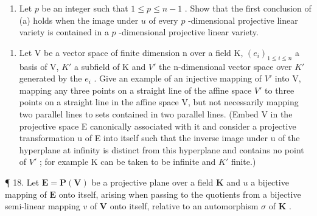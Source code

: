 \begin{enumerate}
\def\labelenumi{(\alph{enumi})}
\setcounter{enumi}{1}
\tightlist
\item
  Let \(p\) be an integer such that \(1 \leqslant p \leqslant n - 1\) . Show that the first conclusion of (a) holds when the image under \(u\) of every \(p\) -dimensional projective linear variety is contained in a \(p\) -dimensional projective linear variety.
\end{enumerate}

\begin{enumerate}
\def\labelenumi{\arabic{enumi}.}
\setcounter{enumi}{16}
\tightlist
\item
  Let V be a vector space of finite dimension n over a field K, \((e_{i})_{1\leq i\leq n}\) a basis of V, \(K'\) a subfield of K and \(V'\) the n-dimensional vector space over \(K'\) generated by the \(e_{i}\) . Give an example of an injective mapping of \(V'\) into V, mapping any three points on a straight line of the affine space \(V'\) to three points on a straight line in the affine space V, but not necessarily mapping two parallel lines to sets contained in two parallel lines. (Embed V in the projective space E canonically associated with it and consider a projective transformation u of E into itself such that the inverse image under u of the hyperplane at infinity is distinct from this hyperplane and contains no point of \(V'\) ; for example K can be taken to be infinite and \(K'\) finite.)
\end{enumerate}

¶ 18. Let \(\mathbf{E} = \mathbf{P}(\mathbf{V})\) be a projective plane over a field \(\mathbf{K}\) and \(u\) a bijective mapping of \(\mathbf{E}\) onto itself, arising when passing to the quotients from a bijective semi-linear mapping \(v\) of \(\mathbf{V}\) onto itself, relative to an automorphism \(\sigma\) of \(\mathbf{K}\) .


